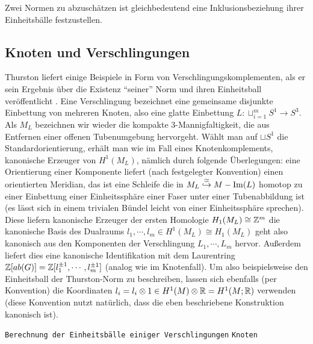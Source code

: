     \begin{bem}
        Zwei Normen zu abzuschätzen ist gleichbedeutend eine Inklusionsbeziehung ihrer Einheitsbälle festzustellen.
    \end{bem}

    \subsection{Knoten und Verschlingungen}
        
    \begin{bsp}[Verschlingungen]
    \label{ex:links}
        Thurston liefert einige Beispiele in Form von Verschlingungskomplementen, als er sein Ergebnis über die Existenz "`seiner"' Norm und ihren Einheitsball veröffentlicht \cite{Thurston.1986}. Eine Verschlingung bezeichnet eine gemeinsame disjunkte Einbettung von mehreren Knoten, also eine glatte Einbettung $L: \sqcup_{i=1}^m S^1 \to S^3$. Als $M_L$ bezeichnen wir wieder die kompakte 3-Mannigfaltigkeit, die aus Entfernen einer offenen Tubenumgebung hervorgeht. Wählt man auf $\sqcup S^1$ die Standardorientierung, erhält man wie im Fall eines Knotenkomplements, kanonische Erzeuger von $H^1(M_L)$, nämlich durch folgende Überlegungen: eine Orientierung einer Komponente liefert (nach festgelegter Konvention) einen orientierten Meridian, das ist eine Schleife die in $M_L\stackrel \simeq {\hookrightarrow} M - \operatorname{Im}(L)$ homotop zu einer Einbettung einer Einheitssphäre einer Faser unter einer Tubenabbildung ist (es lässt sich in einem trivialen Bündel leicht von einer Einheitssphäre sprechen). Diese liefern kanonische Erzeuger der ersten Homologie $H_1(M_L) \cong \mathbb{Z}^m$ die kanonische Basis des Dualraums $l_1,\cdots,l_m \in H^1(M_L)\cong H_1(M_L)$ geht also kanonisch aus den Komponenten der Verschlingung $L_1,\cdots,L_m$ hervor. Außerdem liefert dies eine kanonische Identifikation mit dem Laurentring $\mathbb{Z}[ab(G)]=\mathbb{Z}[l_1^{\pm 1},\cdots,l_m^{\pm 1}]$ (analog wie im Knotenfall). Um also beispielsweise den Einheitsball der Thurston-Norm zu beschreiben, lassen sich ebenfalls (per Konvention) die Koordinaten $l_i=l_i \otimes 1 \in H^1(M)\otimes \mathbb{R} = H^1(M;\mathbb{R})$ verwenden (diese Konvention nutzt natürlich, dass die eben beschriebene Konstruktion kanonisch ist).\\

    \end{bsp}
        \texttt{Berechnung der Einheitsbälle einiger Verschlingungen}
        \texttt{Knoten}
